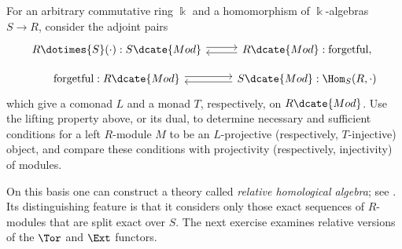 	\item For an arbitrary commutative ring $\Bbbk$ and a homomorphism of
	$\Bbbk$-algebras $S\to R$, consider the adjoint pairs
	\begin{equation*}\begin{tikzcd}[row sep=small]
		R \dotimes{S} (\cdot): S\dcate{Mod} \arrow[shift left, r] & R\dcate{Mod}: \text{forgetful}, \arrow[shift left, l] \\
		\text{forgetful}: R\dcate{Mod} \arrow[shift left, r] & S\dcate{Mod}: \Hom_S(R, \cdot) \arrow[shift left, l]
	\end{tikzcd}\end{equation*}
	which give a comonad $L$ and a monad $T$, respectively, on
	$R\dcate{Mod}$. Use the lifting property above, or its dual, to determine
	necessary and sufficient conditions for a left $R$-module $M$ to be an
	$L$-projective (respectively, $T$-injective) object, and compare these
	conditions with projectivity (respectively, injectivity) of modules.

	On this basis one can construct a theory called \emph{relative
	homological algebra}; see \cite{Ho56}. Its distinguishing feature is that
	it considers only those exact sequences of $R$-modules that are split
	exact over $S$. The next exercise examines relative versions of the
	$\Tor$ and $\Ext$ functors.

